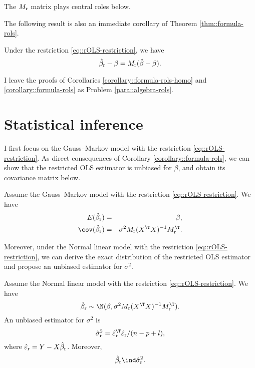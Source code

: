 The $M_\textup{r} $ matrix plays central roles below.





 
 
 The following result is also an immediate corollary of Theorem \ref{thm::formula-rols}. 
 
 \begin{corollary}
 \label{corollary::formula-rols}
 Under the restriction \eqref{eq::rOLS-restriction}, we have 
 $$
 \hat{\beta}_\textup{r} - \beta = M_\textup{r} ( \hat{\beta} - \beta  ) . 
 $$
 \end{corollary}
 
 
 I leave the proofs of Corollaries \ref{corollary::formula-rols-homo} and \ref{corollary::formula-rols} as Problem \ref{para::algebra-rols}. 
 
 
 \section{Statistical inference}\label{sec::stat-inf-rols}

I first focus on the Gauss--Markov model with the restriction \eqref{eq::rOLS-restriction}.  As direct consequences of Corollary \ref{corollary::formula-rols}, we can show that the restricted OLS estimator is unbiased for $\beta$, and obtain its covariance matrix below. 



\begin{corollary}
\label{corollary::moments-rols}
Assume the Gauss--Markov model with the restriction \eqref{eq::rOLS-restriction}. We have 
\begin{eqnarray*}
E (\hat{\beta}_\textup{r}  )  & = & \beta    ,\\ 
\cov(  \hat{\beta}_\textup{r}  ) & = &
\sigma^2 M_\textup{r} (X^{\T}X)^{-1} M_\textup{r}^{\T}.
\end{eqnarray*}
\end{corollary}



Moreover, under the Normal linear model with the restriction \eqref{eq::rOLS-restriction}, we can derive the exact distribution of the restricted OLS estimator and propose an unbiased estimator for $\sigma^2$. 


\begin{theorem}
\label{thm::distribution-normal-rols}
Assume the Normal linear model with the restriction \eqref{eq::rOLS-restriction}. We have 
$$
\hat{\beta}_\textup{r}  \sim \N (  \beta ,  \sigma^2 M_\textup{r} (X^{\T}X)^{-1} M_\textup{r}^{\T}). 
$$
An unbiased estimator for $\sigma^2$ is
$$
\hat{\sigma}^2_\textup{r} = \hat{\varepsilon}_\textup{r} ^{\T} \hat{\varepsilon}_\textup{r}  / (n-p+l),
$$
where $\hat{\varepsilon}_\textup{r}  =  Y - X \hat{\beta}_\textup{r} $. Moreover, 
$$
\hat{\beta}_\textup{r}   \ind \hat{\sigma}^2_\textup{r} .
$$
\end{theorem}


